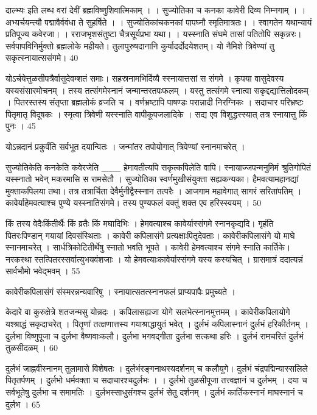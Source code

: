 दाल्भ्यः
इति लब्ध वरां देवीं ब्रह्मविष्णुशिवात्मिकाम् ।
।
सुज्योतिका च कनका कावेरी दिव्य निम्नगाम् ।
।
अभ्यर्चयन्त्यौ पद्मावैर्ववंधा ते सुहर्षिते ।
।
सुज्योतिकांचकनकां पापघ्नौ स्मृतिमात्रतः।
।
स्वागतेन यथान्यायं प्रतिपूज्य कवेरजा।
।
रराजभृशसंतुष्टा चैत्रसूर्यप्रभा यथा।
।
यस्स्नाति संघमे तासां पतितोपि सकृन्नरः।
सर्वपापविनिर्मुक्तो ब्रह्मलोके महीयते।
तुलापुरुषदानानि कुर्यादर्दोदयेशतम्।
यो नैमिशे त्रिवेण्यां तु सकृत्स्नायात्ससंगमे।
40

योऽर्चयेत्तुळसीपत्रैर्वासुदेवम्शतं समाः।
सहस्रनामभिर्दिव्यै स्स्नायात्तसां स संगमे ।
कृपया वासुदेवस्य यस्यसंसारमोचनम् ।
तस्य तत्संगमेस्नानं जन्मान्तरतपःफलम् ।
यस्तु तत्संगमे स्नात्वा सकृद्दद्यात्तिलोदकम् ।
पितरस्तस्य संतृप्ता ब्रह्मलोकं व्रजति च ।
वर्णभ्रष्टापि पाषण्डः परान्नादी निरग्निकः ।
सदाचार परिभ्रष्टः पितृमातृ विदूषकः ।
स्मृत्वा त्रिवेणी यस्स्नाति वापीकूपजलादिके ।
सद्य एव विशुद्धस्स्यात् तत्र स्नायात्तु किं पुनः ।
45

योऽन्नदानं प्रकुर्वंति सर्वभूत दयान्वितः ।
जन्मांतर तपोयोगात् त्रिवेण्यां स्नानमाचरेत् ।

सुज्योतिकेति कनकेति कवेरजेति
___ हेमावतीत्यपि सकृत्कपिलेति वापि।
स्नायाज्जपन्मनुमिमं श्रुतिगोपितं
यस्स्नातो भवेन् मकरमासि स रामसेतौ ।
सुज्योतिका स्वर्णमुखीसंयुक्ता सह्यकन्यका।
हैमवत्यामहानद्यां मुक्ताकपिलया तथा।
तत्र तत्रार्चिता देवैर्मुनीद्वैस्स्नान तत्परैः ।
आजगाम महावेगात् सागरं सरितांपतिम् ।
कावेर्याहेमवत्याश्च पुण्ये यस्स्नातिसंगमे।
तस्य पुण्यफलं वक्तुं शक्त एव हरिस्स्वयम् ।
50

किं तस्य वेदैःकिंतीर्थैः किं व्रतैः किं मघादिभिः ।
हेमवत्याश्च कावेर्यास्संगमे स्नानकृद्यदि।
गृहंति पितरःपिण्डान् गयायां दिवसंस्थिताः ।
कावेरी कपिलासंगे प्रत्यक्षाःपितृदेवताः।
कावेरीकपिलासंगे यो माघे स्नानमाचरेत् ।
सार्धत्रिकोटितीर्थेषु स्नातो भवति भूपते ।
कावेरी हेमवत्याश्च संगमे स्नाति कार्तिके।
नरकस्था स्तत्पितरस्सर्वात्युभयवंशजाः ।
यो हेमवत्याःकावेर्यास्संगमे यस्य कस्यचित् ।
ग्रासमात्रं ददात्यन्नं सार्वभौमो भवेद्भवम् ।
55

कावेरीकपिलासंगं संस्मरन्नन्यवारिषु ।
स्नायात्सतत्स्नानफलं प्राप्यपापैः प्रमुच्यते ।

केदारे वा कुरुक्षेत्रे शतजन्मसु योन्नदः ।
कपिलासह्यजा योगे सलभेत्स्नानमुत्तमम् ।
कावेरीकपिलायोगे यश्श्राद्धं सकृदाचरेत् ।
पितॄणां तत्क्षणात्तस्य गयाश्राद्धायुतं भवेत् ।
दुर्लभं कपिलास्नानं दुर्लभं हरिकीर्तनम् ।
दुर्लभा विष्णुपूजा च दुर्लभा वैष्णवाःकलौ।
दुर्लभा भगवद्गीता दुर्लभा सत्कथा हरिः ।
दुर्लभं रामचरितं दुर्लभं तुळसीदळम् ।
60

दुर्लभं जाह्नवीस्नानम् तुलामासे विशेषतः ।
दुर्लभंरङ्गनाथस्यदर्शनम् च कलौयुगे।
दुर्लभं चंद्रपद्मिन्यास्सलिले पितृतर्पणम् ।
दुर्लभो धर्मवक्ता च सदाचारश्चदुर्लभः ।
।
दुर्लभो तुळसीपूजा तत्त्वज्ञानं च दुर्लभम् ।
दया च सर्वभूतेषु दुर्लभा च समामतिः ।
दुर्लभस्साधुसंगश्च दुर्लभं सेतु दर्शनम् ।
दुर्लभं कार्तिकस्नानं माघस्नानं च दुर्लभ ।
65

